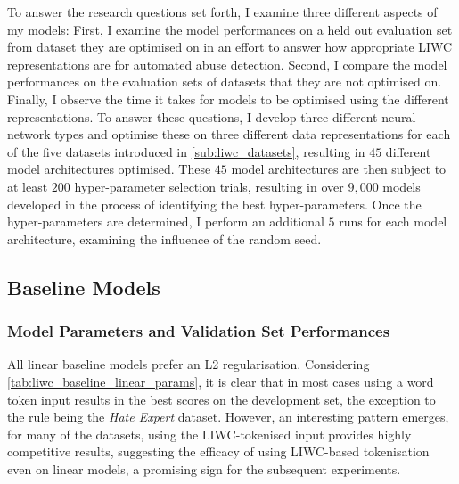 To answer the research questions set forth, I examine three different aspects of my models: First, I examine the model performances on a held out evaluation set from dataset they are optimised on in an effort to answer how appropriate LIWC representations are for automated abuse detection.
Second, I compare the model performances on the evaluation sets of datasets that they are not optimised on. 
Finally, I observe the time it takes for models to be optimised using the different representations.
To answer these questions, I develop three different neural network types and optimise these on three different data representations for each of the five datasets introduced in \cref{sub:liwc_datasets}, resulting in $45$ different model architectures optimised.
These $45$ model architectures are then subject to at least $200$ hyper-parameter selection trials, resulting in over $9,000$ models developed in the process of identifying the best hyper-parameters.
Once the hyper-parameters are determined, I perform an additional $5$ runs for each model architecture, examining the influence of the random seed.

\subsection{Baseline Models}

\subsubsection{Model Parameters and Validation Set Performances}
All linear baseline models prefer an L2 regularisation.
Considering \cref{tab:liwc_baseline_linear_params}, it is clear that in most cases using a word token input results in the best scores on the development set, the exception to the rule being the \textit{Hate Expert} dataset.
However, an interesting pattern emerges, for many of the datasets, using the LIWC-tokenised input provides highly competitive results, suggesting the efficacy of using LIWC-based tokenisation even on linear models, a promising sign for the subsequent experiments.

